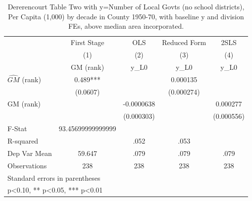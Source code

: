 \begin{table}[htbp]\centering
\def\sym#1{\ifmmode^{#1}\else\(^{#1}\)\fi}
\caption{Dererencourt Table Two with y=Number of Local Govts (no school districts), Per Capita (1,000) by decade in County 1950-70, with baseline y and division FEs, above median area incorporated.}
\begin{tabular}{l*{4}{c}}
\toprule
                    & First Stage   &         OLS   &Reduced Form   &        2SLS   \\
                    &\multicolumn{1}{c}{(1)}&\multicolumn{1}{c}{(2)}&\multicolumn{1}{c}{(3)}&\multicolumn{1}{c}{(4)}\\
                    &\multicolumn{1}{c}{GM  (rank)}&\multicolumn{1}{c}{y\_L0}&\multicolumn{1}{c}{y\_L0}&\multicolumn{1}{c}{y\_L0}\\
\midrule
$\hat{GM}$ (rank)   &       0.489***&               &    0.000135   &               \\
                    &    (0.0607)   &               &  (0.000274)   &               \\
\addlinespace
GM  (rank)          &               &  -0.0000638   &               &    0.000277   \\
                    &               &  (0.000303)   &               &  (0.000556)   \\
\midrule
F-Stat              &93.45699999999999   &               &               &               \\
R-squared           &               &        .052   &        .053   &               \\
Dep Var Mean        &      59.647   &        .079   &        .079   &        .079   \\
Observations        &         238   &         238   &         238   &         238   \\
\bottomrule
\multicolumn{5}{l}{\footnotesize Standard errors in parentheses}\\
\multicolumn{5}{l}{\footnotesize * p<0.10, ** p<0.05, *** p<0.01}\\
\end{tabular}
\end{table}
